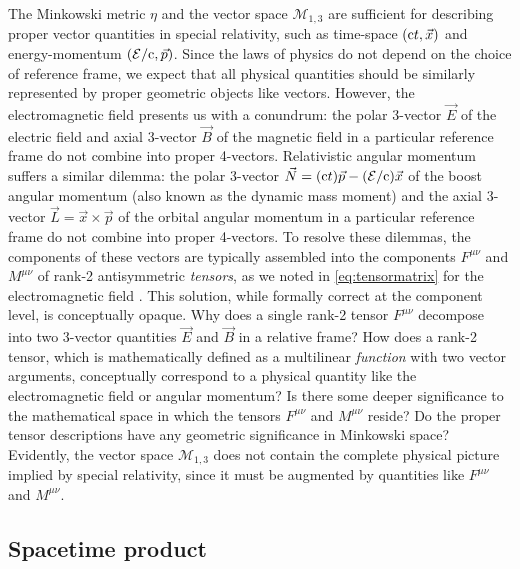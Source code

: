 \documentclass[1p,sort&compress]{elsarticle}
\numberwithin{equation}{section}
\newcommand{\rv}[1]{\vec{#1}}
\newcommand{\cc}{{\rm c}}
\begin{document}
The Minkowski metric $\eta$ and the vector space $\mathcal{M}_{1,3}$ are sufficient for describing proper vector quantities in special relativity, such as time-space $(\cc t,\rv{x})$ and energy-momentum $(\mathcal{E}/\cc,\rv{p})$.  Since the laws of physics do not depend on the choice of reference frame, we expect that all physical quantities should be similarly represented by proper geometric objects like vectors.  However, the electromagnetic field presents us with a conundrum: the polar 3-vector $\rv{E}$ of the electric field and axial 3-vector $\rv{B}$ of the magnetic field in a particular reference frame do not combine into proper 4-vectors.  Relativistic angular momentum suffers a similar dilemma: the polar 3-vector $\rv{N} = (\cc t)\rv{p}-(\mathcal{E}/\cc)\rv{x}$ of the boost angular momentum (also known as the dynamic mass moment) and the axial 3-vector $\rv{L} = \rv{x}\times\rv{p}$ of the orbital angular momentum in a particular reference frame do not combine into proper 4-vectors.  To resolve these dilemmas, the components of these vectors are typically assembled into the components $F^{\mu\nu}$ and $M^{\mu\nu}$ of rank-2 antisymmetric \emph{tensors}, as we noted in \eqref{eq:tensormatrix} for the electromagnetic field \cite{Soper1976,Landau1975}. This solution, while formally correct at the component level, is conceptually opaque.  Why does a single rank-2 tensor $F^{\mu\nu}$ decompose into two 3-vector quantities $\rv{E}$ and $\rv{B}$ in a relative frame?  How does a rank-2 tensor, which is mathematically defined as a multilinear \emph{function} with two vector arguments, conceptually correspond to a physical quantity like the electromagnetic field or angular momentum?  Is there some deeper significance to the mathematical space in which the tensors $F^{\mu\nu}$ and $M^{\mu\nu}$ reside?  Do the proper tensor descriptions have any geometric significance in Minkowski space?  Evidently, the vector space $\mathcal{M}_{1,3}$ does not contain the complete physical picture implied by special relativity, since it must be augmented by quantities like $F^{\mu\nu}$ and $M^{\mu\nu}$.


\subsection{Spacetime product}

\end{document}
